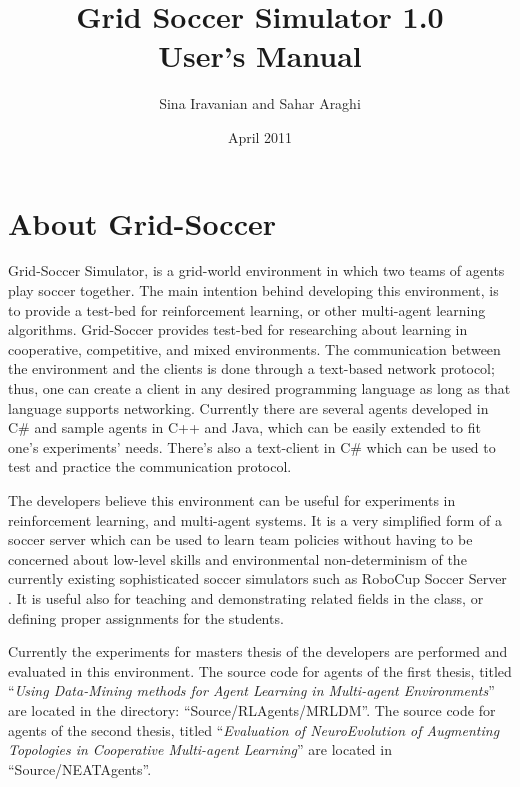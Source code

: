 \documentclass[12pt,titlepage,a4paper]{article}
\begin{document}
\title{Grid Soccer Simulator 1.0\\User's Manual}

\author{Sina Iravanian and Sahar Araghi}
\date{April 2011}
\maketitle

\tableofcontents

\newpage

\section{About Grid-Soccer}

Grid-Soccer Simulator, is a grid-world environment in which two teams of agents play soccer together. The main intention behind developing this environment, is to provide a test-bed for reinforcement learning, or other multi-agent learning algorithms. Grid-Soccer provides test-bed for researching about learning in cooperative, competitive, and mixed environments. The communication between the environment and the clients is done through a text-based network protocol; thus, one can create a client in any desired programming language as long as that language supports networking. Currently there are several agents developed in C\# and sample agents in C++ and Java, which can be easily extended to fit one's experiments' needs. There's also a text-client in C\# which can be used to test and practice the communication protocol.

The developers believe this environment can be useful for experiments in reinforcement learning, and multi-agent systems. It is a very simplified form of a soccer server which can be used to learn team policies without having to be concerned about low-level skills and environmental non-determinism of the currently existing sophisticated soccer simulators such as RoboCup Soccer Server \cite{sservermanual03}. It is useful also for teaching and demonstrating related fields in the class, or defining proper assignments for the students. 

Currently the experiments for masters thesis of the developers are performed and evaluated in this environment. The source code for agents of the first thesis, titled ``\emph{Using Data-Mining methods for Agent Learning in Multi-agent Environments}'' \cite{sahar10ms} are located in the directory: ``Source/RLAgents/MRLDM''. The source code for agents of the second thesis, titled ``\emph{Evaluation of NeuroEvolution of Augmenting Topologies in Cooperative Multi-agent Learning}'' \cite{sina11ms} are located in ``Source/NEATAgents''.
\end{document}
